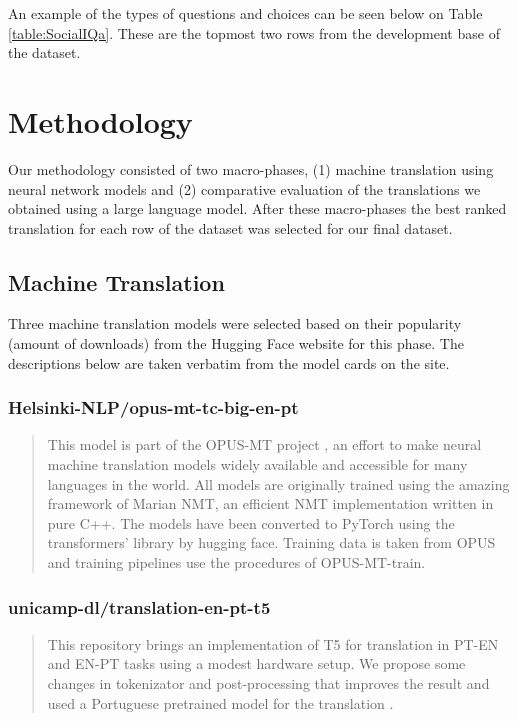 \documentclass{article}
\begin{document}
An example of the types of questions and choices can be seen below on Table
\ref{table:SocialIQa}. These are the topmost two rows from the development base
of the dataset.
 

\section{Methodology} 

Our methodology consisted of two macro-phases, (1) machine translation using
neural network models and (2) comparative evaluation of the translations we
obtained using a large language model. After these macro-phases the best ranked
translation for each row of the dataset was selected for our final dataset.

\subsection{Machine Translation}
\label{subsec:machine-translation}

Three machine translation models were selected based on their popularity (amount
of downloads) from the Hugging Face website for this phase. The descriptions
below are taken verbatim from the model cards on the site.

\subsubsection{Helsinki-NLP/opus-mt-tc-big-en-pt}

\begin{quote}
This model is part of the OPUS-MT project \cite{tiedemann2020opus}, an effort to
make neural machine translation models widely available and accessible for many
languages in the world. All models are originally trained using the amazing
framework of Marian NMT, an efficient NMT implementation written in pure C++.
The models have been converted to PyTorch using the transformers' library by
hugging face. Training data is taken from OPUS and training pipelines use the
procedures of OPUS-MT-train.
\end{quote}

\subsubsection{unicamp-dl/translation-en-pt-t5}

\begin{quote}
This repository brings an implementation of T5 for translation in PT-EN and
EN-PT tasks using a modest hardware setup. We propose some changes in
tokenizator and post-processing that improves the result and used a Portuguese
pretrained model for the translation \cite{lopes2020lite}.
\end{quote}
\end{document}
